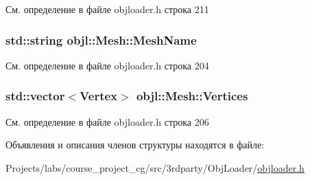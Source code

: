 См. определение в файле objloader.\+h строка 211

\subsubsection[{\texorpdfstring{Mesh\+Name}{MeshName}}]{\setlength{\rightskip}{0pt plus 5cm}std\+::string objl\+::\+Mesh\+::\+Mesh\+Name}\hypertarget{structobjl_1_1_mesh_adb064651366cfec31fc0886a0ac18b9b}{}\label{structobjl_1_1_mesh_adb064651366cfec31fc0886a0ac18b9b}


См. определение в файле objloader.\+h строка 204

\subsubsection[{\texorpdfstring{Vertices}{Vertices}}]{\setlength{\rightskip}{0pt plus 5cm}std\+::vector$<${\bf Vertex}$>$ objl\+::\+Mesh\+::\+Vertices}\hypertarget{structobjl_1_1_mesh_a9c7fcc401666c37b4faa458cd2aac704}{}\label{structobjl_1_1_mesh_a9c7fcc401666c37b4faa458cd2aac704}


См. определение в файле objloader.\+h строка 206



Объявления и описания членов структуры находятся в файле\+:\begin{DoxyCompactItemize}
\item 
Projects/labs/course\+\_\+project\+\_\+cg/src/3rdparty/\+Obj\+Loader/\hyperlink{3rdparty_2_obj_loader_2objloader_8h}{objloader.\+h}\end{DoxyCompactItemize}
